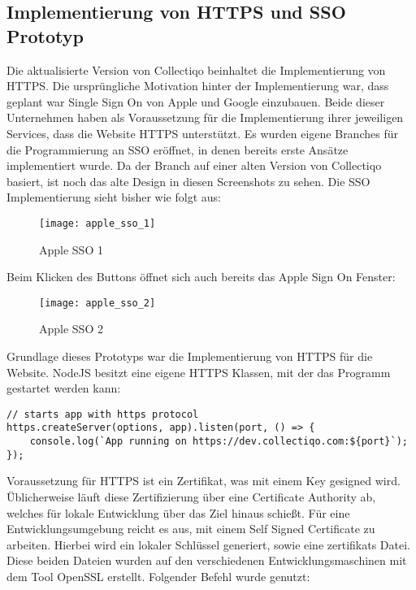 \subsection{Implementierung von HTTPS und SSO Prototyp}\label{subsec:implementierung-von-https}

Die aktualisierte Version von Collectiqo beinhaltet die Implementierung von HTTPS.
Die ursprüngliche Motivation hinter der Implementierung war, dass geplant war Single Sign On von Apple und Google einzubauen.
Beide dieser Unternehmen haben als Voraussetzung für die Implementierung ihrer jeweiligen Services, dass die Website HTTPS unterstützt.
Es wurden eigene Branches für die Programmierung an SSO eröffnet, in denen bereits erste Ansätze implementiert wurde.
Da der Branch auf einer alten Version von Collectiqo basiert, ist noch das alte Design in diesen Screenshots zu sehen.
Die SSO Implementierung sieht bisher wie folgt aus:

\begin{figure}[h]
    \centering
    \texttt{[image: apple\_sso\_1]}
    \caption{Apple SSO 1}
    \label{fig:apple_sso_1}
\end{figure}

Beim Klicken des Buttons öffnet sich auch bereits das Apple Sign On Fenster:

\begin{figure}[h]
    \centering
    \texttt{[image: apple\_sso\_2]}
    \caption{Apple SSO 2}
    \label{fig:apple_sso_2}
\end{figure}

Grundlage dieses Prototyps war die Implementierung von HTTPS für die Website.
NodeJS besitzt eine eigene HTTPS Klassen, mit der das Programm gestartet werden kann:

\vspace{1em}
\lstset{language=JavaScript}
\begin{lstlisting}[label={lst:https}]
// starts app with https protocol
https.createServer(options, app).listen(port, () => {
    console.log(`App running on https://dev.collectiqo.com:${port}`);
});
\end{lstlisting}
\vspace{1em}

Voraussetzung für HTTPS ist ein Zertifikat, was mit einem Key gesigned wird.
Üblicherweise läuft diese Zertifizierung über eine Certificate Authority ab, welches für lokale Entwicklung über das Ziel hinaus schießt.
Für eine Entwicklungsumgebung reicht es aus, mit einem Self Signed Certificate zu arbeiten.
Hierbei wird ein lokaler Schlüssel generiert, sowie eine zertifikats Datei.
Diese beiden Dateien wurden auf den verschiedenen Entwicklungsmaschinen mit dem Tool OpenSSL erstellt.
Folgender Befehl wurde genutzt:

